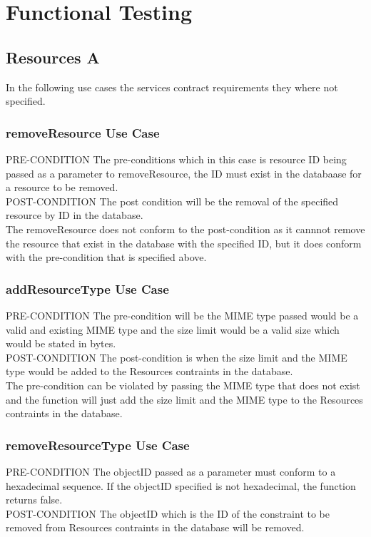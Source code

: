 \documentclass[a4paper]{article}
\begin{document}
\section {Functional Testing}
\subsection {Resources A}
In the following use cases the services contract requirements they where not specified.
\\
\subsubsection{removeResource Use Case}
PRE-CONDITION
The pre-conditions which in this case is resource ID being passed as a parameter to removeResource, the ID must exist in the databaase for a resource to be removed. 
\\
POST-CONDITION
The post condition will be the removal of the specified resource by ID in the database.
\\
The removeResource does not conform to the post-condition as it cannnot remove the resource that exist in the database with the specified ID, but it does conform with the pre-condition that is specified above. 
\subsubsection{addResourceType Use Case}
PRE-CONDITION
The pre-condition will be the MIME type passed would be a valid and existing MIME type and the size limit would be a valid size which would be stated in bytes.
\\
POST-CONDITION
The post-condition is when the size limit and the MIME type would be added to the Resources contraints in the database.
\\
The pre-condition can be violated by passing the MIME type that does not exist and the function will just add the size limit and the MIME type to the Resources contraints in the database.
\subsubsection{removeResourceType Use Case}
PRE-CONDITION
The objectID passed as a parameter must conform to a hexadecimal sequence. If the objectID specified is not hexadecimal, the function returns false.
\\
POST-CONDITION
The objectID which is the ID of the constraint to be removed from Resources contraints in the database will be removed.
\end{document}
